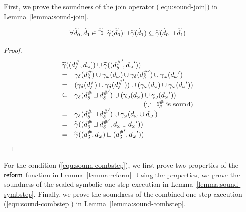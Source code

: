 First, we prove the soundness of the join operator (\ref{equ:sound-join}) in
Lemma~\ref{lemma:sound-join}.
\begin{lemma}\label{lemma:sound-join}
  \[
    \forall \widetilde{d}_0, \widetilde{d}_1 \in \widetilde{\mathbb{D}}. \; \widetilde{\gamma}(\widetilde{d}_0) \cup
    \widetilde{\gamma}(\widetilde{d}_1) \subseteq \widetilde{\gamma}(\widetilde{d}_0 \sqcup \widetilde{d}_1)
  \]
\end{lemma}
\begin{proof}
  \[
    \begin{array}{cl}
      \multicolumn{2}{l}{
        \combgamma((\sabselem, \symbelem)) \cup \combgamma((\sabselem', \symbelem'))
      }\\
      =& \sgamma(\sabselem) \cup \symbgamma(\symbelem)
      \cup \sgamma(\sabselem') \cup \symbgamma(\symbelem')\\
      =& (\sgamma(\sabselem)\cup \sgamma(\sabselem'))
      \cup (\symbgamma(\symbelem) \cup \symbgamma(\symbelem'))\\
      \subseteq& \sgamma(\sabselem \join \sabselem')
      \cup (\symbgamma(\symbelem) \cup \symbgamma(\symbelem'))\\
      & \multicolumn{1}{r}{(\because \; \sabsdom \; \text{is sound})}\\
      =& \sgamma(\sabselem \join \sabselem')
      \cup \symbgamma(\symbelem \cup \symbelem')\\
      =& \combgamma((\sabselem \join \sabselem', \symbelem \cup \symbelem'))\\
      =& \combgamma((\sabselem, \symbelem) \join (\sabselem', \symbelem'))\\
    \end{array}
  \]
\end{proof}

For the condition (\ref{equ:sound-combstep}), we first prove two properties of the
$\textsf{reform}$ function in Lemma~\ref{lemma:reform}.  Using the properties, we prove
the soundness of the sealed symbolic one-step execution in
Lemma~\ref{lemma:sound-symbstep}.  Finally, we prove the soundness of the
combined one-step execution (\ref{equ:sound-combstep}) in
Lemma~\ref{lemma:sound-combstep}.

